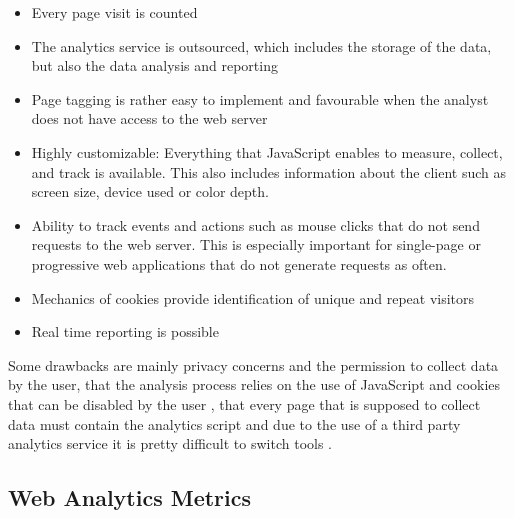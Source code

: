 \begin{itemize}
\item Every page visit is counted %
\item The analytics service is outsourced, which includes the storage of the data, but also the data analysis and reporting %
\item Page tagging is rather easy to implement and favourable when the analyst does not have access to the web server %
\item Highly customizable: Everything that JavaScript enables to measure, collect, and track is available. This also includes information about the client such as screen size, device used or color depth. %
\item Ability to track events and actions such as mouse clicks that do not send requests to the web server. This is especially important for single-page or progressive web applications that do not generate requests as often.  %
\item Mechanics of cookies provide identification of unique and repeat visitors %
\item Real time reporting is possible %
\end{itemize}


Some drawbacks are mainly privacy concerns and the permission to collect data by the user,  that the analysis process relies on the use of JavaScript and cookies that can be disabled by the user \cite{2011Marek}, that every page that is supposed to collect data must contain the analytics script and due to the use of a third party analytics service it is pretty difficult to switch tools \cite{2014Singal}.














\subsection{Web Analytics Metrics}


